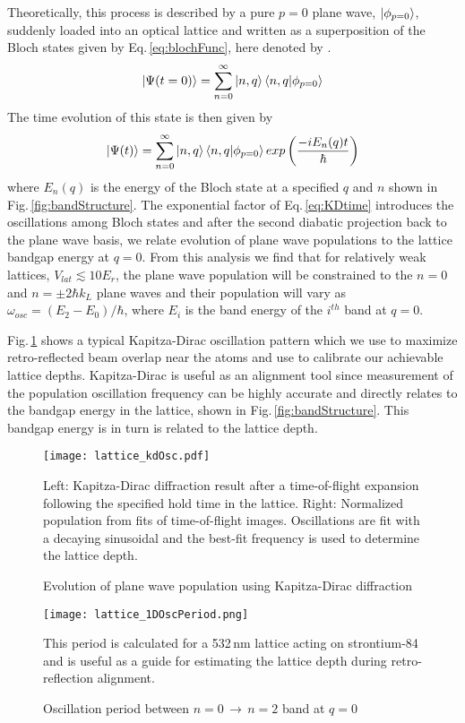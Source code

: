 Theoretically, this process is described by a pure $p=0$ plane wave, $\left| {\phi_{p=0}} \right>$, suddenly loaded into an optical lattice and written as a superposition of the Bloch states given by Eq.\,\ref{eq:blochFunc}, here denoted by .
	\begin{equation} \label{eq:p0inBloch}
		\left| {\Psi(t=0)} \right> = \sum_{n=0}^{\infty} \left| {n,q} \right> \left< {n,q} | {\phi_{p=0}} \right>
	\end{equation}
The time evolution of this state is then given by
	\begin{equation} \label{eq:KDtime}
		\left| {\Psi(t)} \right> = \sum_{n=0}^{\infty} \left| {n,q} \right> \left< {n,q} | {\phi_{p=0}} \right> exp \left( \frac{-i E_n(q) t}{\hbar} \right)
	\end{equation}
where $E_n(q)$ is the energy of the Bloch state at a specified $q$ and $n$ shown in Fig.\,\ref{fig:bandStructure}.
The exponential factor of Eq.\,\ref{eq:KDtime} introduces the oscillations among Bloch states and after the second diabatic projection back to the plane wave basis, we relate evolution of plane wave populations to the lattice bandgap energy at $q=0$.
From this analysis we find that for relatively weak lattices, $V_{lat} \lesssim 10 E_r$, the plane wave population will be constrained to the $n=0$ and $n = \pm 2 \hbar k_L$ plane waves and their population will vary as $\omega_{osc} = (E_2 - E_0) / \hbar$, where $E_i$ is the band energy of the $i^{th}$ band at $q=0$.

Fig.\,\ref{fig:KDoscillations} shows a typical Kapitza-Dirac oscillation pattern which we use to maximize retro-reflected beam overlap near the atoms and use to calibrate our achievable lattice depths. 
Kapitza-Dirac is useful as an alignment tool since measurement of the population oscillation frequency can be highly accurate and directly relates to the bandgap energy in the lattice, shown in Fig.\,\ref{fig:bandStructure}.
This bandgap energy is in turn is related to the lattice depth.
	\begin{figure}
		\texttt{[image: lattice\_kdOsc.pdf]}
		\caption{Evolution of plane wave population using Kapitza-Dirac diffraction}{Left: Kapitza-Dirac diffraction result after a time-of-flight expansion following the specified hold time in the lattice. Right: Normalized population from fits of time-of-flight images. Oscillations are fit with a decaying sinusoidal and the best-fit frequency is used to determine the lattice depth.}
		 \label{fig:KDoscillations}
	\end{figure}
	
	\begin{figure}
		\centerline{
		\texttt{[image: lattice\_1DOscPeriod.png]}}
		\caption{Oscillation period between $n=0\,\rightarrow\,n=2$ band at $q=0$}{This period is calculated for a 532\,nm lattice acting on strontium-84 and is useful as a guide for estimating the lattice depth during retro-reflection alignment.}
		\label{fig:latOscPeriod}
	\end{figure} 

